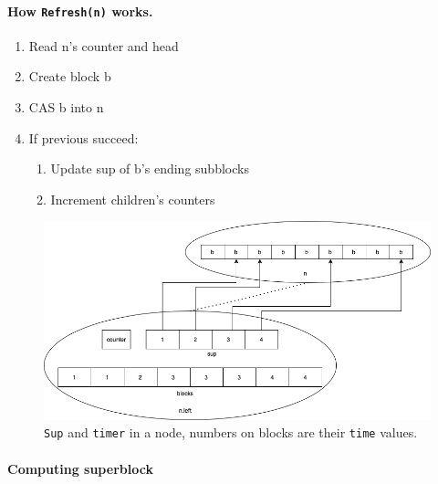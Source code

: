 \documentclass[10pt]{article}
\theoremstyle{definition}
\begin{document}
\paragraph{How \texttt{Refresh(n)} works.}
\begin{enumerate}
  \item Read n's counter and head
  \item Create block b
  \item CAS b into n
  \item If previous succeed:
  \begin{enumerate}
  \item Update sup of b's ending subblocks
  \item Increment children's counters
  \end{enumerate}
\end{enumerate}



\begin{figure}[hbt]
  \center\includegraphics[width=6in]{pics/super}
  \caption{\texttt{Sup} and \texttt{timer} in a node, numbers on blocks are their \texttt{time} values.}
\end{figure}


\pagebreak

\paragraph{Computing superblock}
\end{document}
